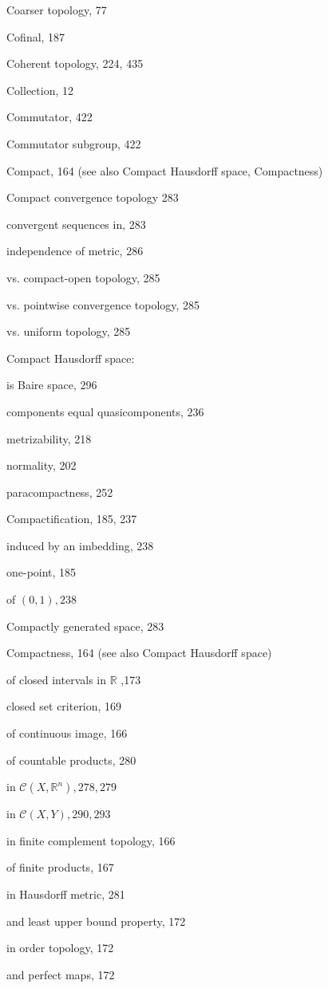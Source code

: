 Coarser topology, 77

Cofinal, 187

Coherent topology, 224, 435

Collection, 12

Commutator, 422

Commutator subgroup, 422

Compact, 164 (see also Compact Hausdorff space, Compactness)

Compact convergence topology 283

convergent sequences in, 283

independence of metric, 286

vs. compact-open topology, 285

vs. pointwise convergence topology, 285

vs. uniform topology, 285

Compact Hausdorff space:

is Baire space, 296

components equal quasicomponents, 236

metrizability, 218

normality, 202

paracompactness, 252

Compactification, 185, 237

induced by an imbedding, 238

one-point, 185

of \(\left( {0,1}\right) ,{238}\)

Compactly generated space, 283

Compactness, 164 (see also Compact Hausdorff space)

of closed intervals in \(\mathbb{R}\) ,173

closed set criterion, 169

of continuous image, 166

of countable products, 280

in \(\mathcal{C}\left( {X,{\mathbb{R}}^{n}}\right) ,{278},{279}\)

in \(\mathcal{C}\left( {X,Y}\right) ,{290},{293}\)

in finite complement topology, 166

of finite products, 167

in Hausdorff metric, 281

and least upper bound property, 172

in order topology, 172

and perfect maps, 172

